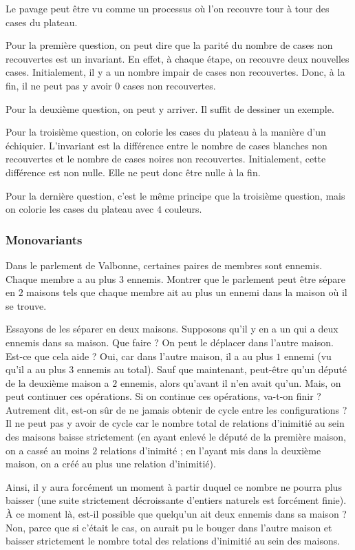 \begin{sol}
Le pavage peut être vu comme un processus où l'on recouvre tour à tour des cases du plateau.

Pour la première question, on peut dire que la parité du nombre de cases non recouvertes est un invariant. En effet, à chaque étape, on recouvre deux nouvelles cases. Initialement, il y a un nombre impair de cases non recouvertes. Donc, à la fin, il ne peut pas y avoir $0$ cases non recouvertes.

Pour la deuxième question, on peut y arriver. Il suffit de dessiner un exemple.

Pour la troisième question, on colorie les cases du plateau à la manière d'un échiquier. L'invariant est la différence entre le nombre de cases blanches non recouvertes et le nombre de cases noires non recouvertes. Initialement, cette différence est non nulle. Elle ne peut donc être nulle à la fin.

Pour la dernière question, c'est le même principe que la troisième question, mais on colorie les cases du plateau avec $4$ couleurs.
\end{sol}


\subsubsection{Monovariants}


\begin{exo}
Dans le parlement de Valbonne, certaines paires de membres sont ennemis. Chaque membre a au plus $3$ ennemis. Montrer que le parlement peut être
sépare en $2$ maisons tels que chaque membre ait au plus un ennemi dans la maison où il se trouve.
\end{exo}

\begin{sol}
Essayons de les séparer en deux maisons. Supposons qu'il y en a un qui a deux ennemis dans sa maison. Que faire ? On peut le déplacer dans l'autre maison. Est-ce que cela aide ? Oui, car dans l'autre maison, il a au plus $1$ ennemi (vu qu'il a au plus $3$ ennemis au total). Sauf que maintenant, peut-être qu'un député de la deuxième maison a $2$ ennemis, alors qu'avant il n'en avait qu'un. Mais, on peut continuer ces opérations. Si on continue ces opérations, va-t-on finir ? Autrement dit, est-on sûr de ne jamais obtenir de cycle entre les configurations ? Il ne peut pas y avoir de cycle car le nombre total de relations d'inimitié au sein des maisons baisse strictement (en ayant enlevé le député de la première maison, on a cassé au moins $2$ relations d'inimité ; en l'ayant mis dans la deuxième maison, on a créé au plus une relation d'inimitié).

Ainsi, il y aura forcément un moment à partir duquel ce nombre ne pourra plus baisser (une suite strictement décroissante d'entiers naturels est forcément finie). À ce moment là, est-il possible que quelqu'un ait deux ennemis dans sa maison ? Non, parce que si c'était le cas, on aurait pu le bouger dans l'autre maison et baisser strictement le nombre total des relations d'inimitié au sein des maisons.
\end{sol}


